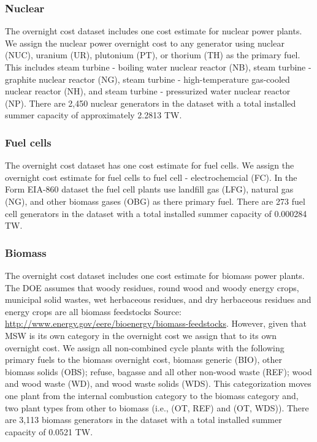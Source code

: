 \documentclass[10pt]{report}
\begin{document}
\subsubsection{Nuclear}
The overnight cost dataset includes one cost estimate for nuclear power plants.
We assign the nuclear power overnight cost to any generator using nuclear (NUC), uranium (UR), plutonium (PT), or thorium (TH) as the primary fuel.  
This includes steam turbine - boiling water nuclear reactor (NB), steam turbine - graphite nuclear reactor (NG), steam turbine - high-temperature gas-cooled nuclear reactor (NH), and steam turbine - pressurized water nuclear reactor (NP).
There are 2,450 nuclear generators in the dataset with a total installed summer capacity of approximately 2.2813 TW.

\subsubsection{Fuel cells}
The overnight cost dataset has one cost estimate for fuel cells.
We assign the overnight cost estimate for fuel cells to fuel cell - electrochemcial (FC). 
In the Form EIA-860 dataset the fuel cell plants use landfill gas (LFG), natural gas (NG), and other biomass gases (OBG) as there primary fuel. 
There are 273 fuel cell generators in the dataset with a total installed summer capacity of 0.000284 TW.

\subsubsection{Biomass}
The overnight cost dataset includes one cost estimate for biomass power plants. 
The DOE assumes that woody residues, round wood and woody energy crops, municipal solid wastes, wet herbaceous residues, and dry herbaceous residues and energy crops are all biomass feedstocks Source: \url{http://www.energy.gov/eere/bioenergy/biomass-feedstocks}. 
However, given that MSW is its own category in the overnight cost we assign that to its own overnight cost.
We assign all non-combined cycle plants with the following primary fuels to the biomass overnight cost, biomass generic (BIO), other biomass solids (OBS); refuse, bagasse and all other non-wood waste (REF); wood and wood waste (WD), and wood waste solids (WDS). 
This categorization moves one plant from the internal combustion category to the biomass category and, two plant types from other to biomass (i.e., (OT, REF) and (OT, WDS)). 
There are 3,113 biomass generators in the dataset with a total installed summer capacity of 0.0521 TW. 
\end{document}
